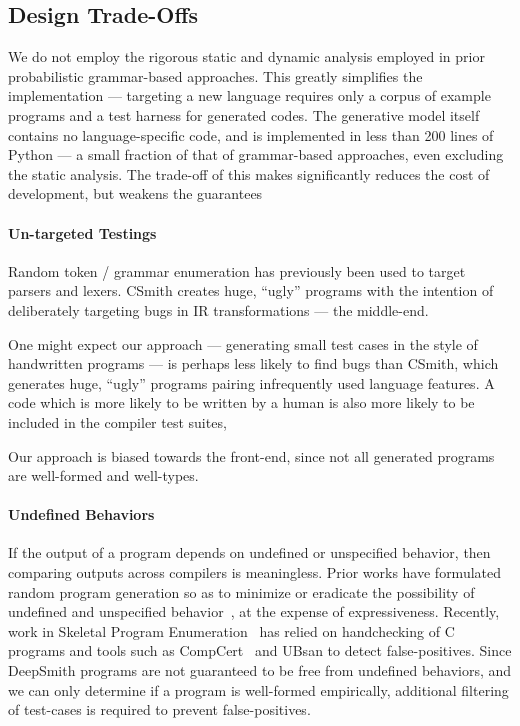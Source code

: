 \subsection{Design Trade-Offs}\label{subsec:discussions}

We do not employ the rigorous static and dynamic analysis employed in prior probabilistic grammar-based approaches. This greatly simplifies the implementation --- targeting a new language requires only a corpus of example programs and a test harness for generated codes. The generative model itself contains no language-specific code, and is implemented in less than 200 lines of Python --- a small fraction of that of grammar-based approaches, even excluding the static analysis. The trade-off of this makes significantly reduces the cost of development, but weakens the guarantees  \cc{\ldots}

\paragraph{Un-targeted Testings} Random token / grammar enumeration has previously been used to target parsers and lexers. CSmith creates huge, ``ugly'' programs with the intention of deliberately targeting bugs in IR transformations --- the middle-end.

One might expect our approach --- generating small test cases in the style of handwritten programs --- is perhaps less likely to find bugs than CSmith, which generates huge, ``ugly'' programs pairing infrequently used language features. A code which is more likely to be written by a human is also more likely to be included in the compiler test suites,  

Our approach is biased towards the front-end, since not all generated programs are well-formed and well-types.

\paragraph{Undefined Behaviors} %
If the output of a program depends on undefined or unspecified behavior, then comparing outputs across compilers is meaningless. Prior works have formulated random program generation so as to minimize or eradicate the possibility of undefined and unspecified behavior~\cite{Yang2011c,Le2013a,Le2015}, at the expense of expressiveness. Recently, work in Skeletal Program Enumeration~\cite{Zhang2017a} has relied on handchecking of C programs and tools such as CompCert~\cite{Leroy2013} and UBsan to detect false-positives. Since DeepSmith programs are not guaranteed to be free from undefined behaviors, and we can only determine if a program is well-formed empirically, additional filtering of test-cases is required to prevent false-positives.

